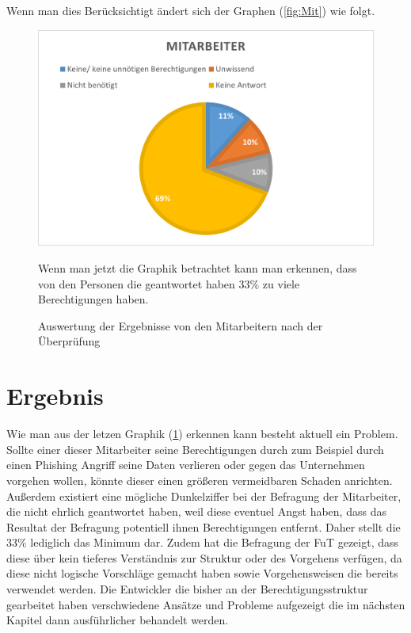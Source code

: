 \newline
Wenn man dies Berücksichtigt ändert sich der Graphen (\ref{fig:Mit}) wie folgt.
\begin{figure}[h!]
 \centering
 \includegraphics[width=1\textwidth]{gfx/Picture/Mitarbeiter(korregiert).PNG}
 \caption{Auswertung der Ergebnisse von den Mitarbeitern nach der Überprüfung}
 \label{fig:MitPruf}
Wenn man jetzt die Graphik betrachtet kann man erkennen, dass von den Personen die geantwortet haben 33\% zu viele Berechtigungen haben.

\end{figure}
\section{Ergebnis}
\label{sec:Ergebnis}

Wie man aus der letzen Graphik (\ref{fig:MitPruf}) erkennen kann besteht aktuell ein Problem.
Sollte einer dieser Mitarbeiter seine Berechtigungen durch zum Beispiel durch einen Phishing Angriff seine Daten verlieren oder gegen das Unternehmen vorgehen wollen, könnte dieser einen größeren vermeidbaren Schaden anrichten.
Außerdem existiert eine mögliche Dunkelziffer bei der Befragung der Mitarbeiter, die nicht ehrlich geantwortet haben, weil diese eventuel Angst haben, dass das Resultat der Befragung potentiell ihnen Berechtigungen entfernt.
Daher stellt die 33\% lediglich das Minimum dar.
Zudem hat die Befragung der \ac{FuT} gezeigt, dass diese über kein tieferes Verständnis zur Struktur oder des Vorgehens verfügen, da diese nicht logische Vorschläge gemacht haben sowie Vorgehensweisen die bereits verwendet werden.
Die Entwickler die bisher an der Berechtigungsstruktur gearbeitet haben verschwiedene Ansätze und Probleme aufgezeigt die im nächsten Kapitel dann ausführlicher behandelt werden.